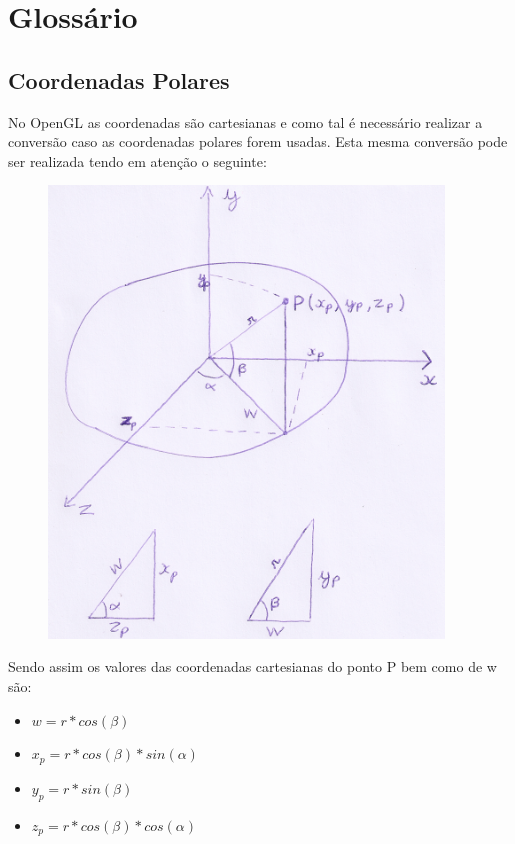\documentclass{article}
\begin{document}
\section{Glossário}

\subsection{Coordenadas Polares}
\label{PolarCoordinates}
No OpenGL as coordenadas são cartesianas e como tal é necessário realizar a conversão caso as coordenadas polares forem usadas. Esta mesma conversão pode ser realizada tendo em atenção o seguinte:

\begin{figure}[H]
\centering
\includegraphics[height=12cm]{scan.png}
\end{figure}
Sendo assim os valores das coordenadas cartesianas do ponto P bem como de w são:
\begin{itemize}
    \item $w = r * cos(\beta)$
    \item $x_{p} = r * cos(\beta) * sin(\alpha)$
    \item $y_{p} = r * sin(\beta)$
    \item $z_{p} = r * cos(\beta) * cos(\alpha)$
\end{itemize}
\end{document}
